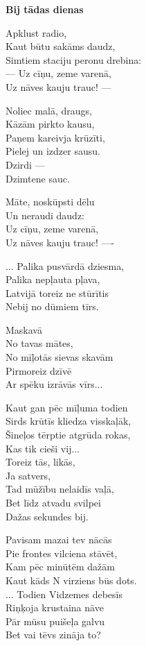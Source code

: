 \documentclass[14pt]{extarticle}
\begin{document}
{{\newpage

{\bf Bij tādas dienas}

Apklust radio,\\
Kaut būtu sakāms daudz,\\
Simtiem staciju peronu drebina:\\
--- Uz cīņu, zeme varenā,\\
Uz nāves kauju trauc! --- 

Noliec malā, draugs,\\
Kāzām pirkto kausu,\\
Paņem kareivja krūzīti,\\
Pielej un izdzer sausu.\\
Dzirdi ---\\
Dzimtene sauc.

Māte, noskūpsti dēlu\\
Un neraudi daudz:\\
Uz cīņu, zeme varenā,\\
Uz nāves kauju trauc! ----

... Palika pusvārdā dziesma,\\
Palika nepļauta pļava,\\
Latvijā toreiz ne stūrītis\\
Nebij no dūmiem tīrs.

Maskavā\\
No tavas mātes,\\
No mīļotās sievas skavām\\
Pirmoreiz dzīvē\\
Ar spēku izrāvās vīrs...

Kaut gan pēc mīļuma todien\\
Sirds krūtīs kliedza visskaļāk,\\
Šineļos tērptie atgrūda rokas,\\
Kas tik cieši vij...\\
Toreiz tās, likās,\\
Ja satvers,\\
Tad mūžību nelaidīs vaļā,\\
Bet līdz atvadu svilpei\\
Dažas sekundes bij. 

Pavisam mazai tev nācās\\
Pie frontes vilciena stāvēt,\\
Kam pēc minūtēm dažām\\
Kaut kāds N virziens būs dots.\\
... Todien Vidzemes debesīs\\
Riņķoja krustaina nāve\\
Pār mūsu puišeļa galvu\\
Bet vai tēvs zināja to?

}}
\end{document}

